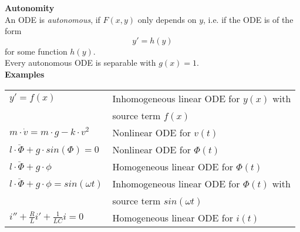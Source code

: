 \textbf{Autonomity}\\
An ODE is \emph{autonomous}, if $F(x, y)$ only depends on $y$, i.e. if the ODE is of the form
\begin{equation}
  y' = h(y)
\end{equation}
for some function $h(y)$.\\
Every autonomous ODE is separable with $g(x) = 1$.\\

\textbf{Examples}\\
\begin{tabular}{ll}
  $y' = f(x)$ & Inhomogeneous linear ODE for $y(x)$ with\\
  & source term $f(x)$\\
  $m \cdot \dot{v} = m \cdot g - k \cdot v^2$ & Nonlinear ODE for $v(t)$\\
  $l \cdot \ddot{\Phi} + g \cdot sin(\Phi) = 0$ & Nonlinear ODE for $\Phi(t)$\\
  $l \cdot \ddot{\Phi} + g \cdot \phi$ & Homogeneous linear ODE for $\Phi(t)$\\
  $l \cdot \ddot{\Phi} + g \cdot \phi = sin(\omega t)$ & Inhomogeneous linear ODE for $\Phi(t)$ with\\
  & source term $sin(\omega t)$\\
  $i''+ \frac{R}{L}i' + \frac{1}{LC}i = 0$ & Homogeneous linear ODE for $i(t)$
\end{tabular}
